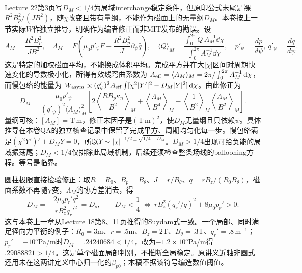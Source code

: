 Lecture 22第3页写$D_M<1/4$为局域interchange稳定条件，但原印公式末尾是裸$R^2B_p^2/(JB^2)$，随$\chi$改变且带有量纲，不能作为磁面上的无量纲$D_M$。本卷按上一节实际$W$作独立推导，明确作为编者修正而非MIT发布的勘误。设
\begin{equation}
A_M=\frac{R^2B_p^2}{JB^2},\quad
\Lambda_M=F\left(\mu_0p'_\psi F
-\frac{R^2B_p^2}{J}\partial_\psi\widehat q\right),\quad
\langle Q\rangle_M=
\frac{\int_0^{2\pi}Q\,A_M^{-1}\dd\chi}
{\int_0^{2\pi}A_M^{-1}\dd\chi},
\quad p'_\psi=\frac{dp}{d\psi},\ q'_\psi=\frac{dq}{d\psi}.
\end{equation}
这是特定的加权磁面平均，不能换成体积平均。完成平方并在大$|\chi|$区间对周期快速变化的导数极小化，所得有效线弯曲系数为
$A_{\rm eff}=\langle A_M\rangle_M=2\pi/\int_0^{2\pi}A_M^{-1}\,\mathrm d\chi$，而慢包络的能量为
$W_{\rm asym}\propto(q'_\psi)^2A_{\rm eff}
\int[\chi^2|Y'|^2-D_M|Y|^2]\,\mathrm d\chi$。由此修正为
\begin{equation}
\boxed{
D_M=\frac{\mu_0p'_\psi}
{(q'_\psi)^2\langle A_M\rangle_M^2}
\left[
2\left\langle\frac{RB_p\kappa_n}{B^2}\right\rangle_M
+\left\langle\frac{\Lambda_M}{B^4}\right\rangle_M
-\left\langle\frac1{B^2}\right\rangle_M
 \left\langle\frac{\Lambda_M}{B^2}\right\rangle_M
\right].}
\end{equation}
量纲可核：$[A_M]=\mathrm{T\,m}$，修正末因子是$(\mathrm{T\,m})^2$，使$D_M$无量纲且只依赖$\psi$。具体推导在本卷QA的独立核查记录中保留了完成平方、周期均匀化每一步。慢包络满足$(\chi^2Y')'+D_MY=0$，所以$Y\sim|\chi|^{-1/2\pm\sqrt{1/4-D_M}}$。$D_M>1/4$出现可给负能的局域振荡尾；$D_M<1/4$仅排除此局域机制，后续还须检查整条场线的ballooning方程。等号是临界。

圆柱极限直接检验修正：取$R=R_0$、$B_p=B_\theta$、$J=r/B_\theta$、$q=rB_z/(R_0B_\theta)$，磁面系数不再随$\chi$变，$\Lambda_M$的协方差消去，得
\begin{equation}
D_M=-\frac{2\mu_0p_r'q^2}{rB_z^2q_r'^2}=D_s,\qquad
D_M<\frac14\ \Longleftrightarrow\
rB_z^2(q_r'/q)^2+8\mu_0p_r'>0 .
\end{equation}
这与本卷上一章从Lecture 18第8、11页推得的Suydam式一致。一个局部、同时满足径向力平衡的例子：$R_0=3$m、$r=.5$m、$B_z=2$T、$B_\theta=.3$T、$q_r'=.8\,\mathrm{m^{-1}}$；$p_r'=-10^5$Pa/m时$D_M=.24240684<1/4$，改为$-1.2\times10^5$Pa/m得$.29088821>1/4$。这是单个磁面局部判别，不推断全局稳定。原讲义近轴非圆式还用未在这两讲定义中心归一化的$\beta_{p0}$；本稿不据该符号编造数值阈值。

